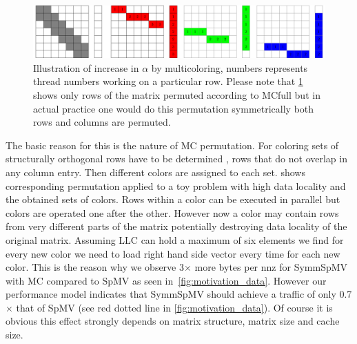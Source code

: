   \begin{figure}[htbp]
  	\centering
  	\includegraphics[scale=0.45]{pics/mc_alpha_problem/mc_alpha_unsymm}
  	\caption{Illustration of increase in $\alpha$ by multicoloring, numbers represents thread numbers working on a particular row. Please note that \cref{fig:mc_alpha} shows only rows of the matrix permuted according to \acrshort{MC}full but in actual practice one would do this permutation symmetrically \ie both rows and columns are permuted.}
  	\label{fig:mc_alpha}
  \end{figure}
  
  The basic reason for this is the nature of \acrlong{MC}  permutation. For \DTWO coloring sets of structurally orthogonal rows have to be determined \cite{dist_k_def}, \ie rows that do not overlap in any column entry. Then different colors are assigned to each set.  shows corresponding permutation applied to a toy problem with high data locality and the obtained sets of colors. Rows within a color can be executed in parallel but colors are operated one after the other. However now a color may contain rows from very different parts of the matrix potentially destroying data locality of the original matrix.  Assuming \acrfull{LLC} can hold a maximum of six elements we find for every new color we need to load right hand side vector every time for each new color. This is the reason why we observe 3$\times$ more bytes per \acrshort{nnz} for \acrshort{SymmSpMV} with \acrshort{MC} compared to \acrshort{SpMV} as seen in~\cref{fig:motivation_data}.  However our performance model indicates that \acrshort{SymmSpMV} should achieve a traffic of only 0.7$\times$ that of \acrshort{SpMV} (see red dotted line in \cref{fig:motivation_data}). Of course it is obvious this effect strongly depends on matrix structure, matrix size and cache size. 
      
